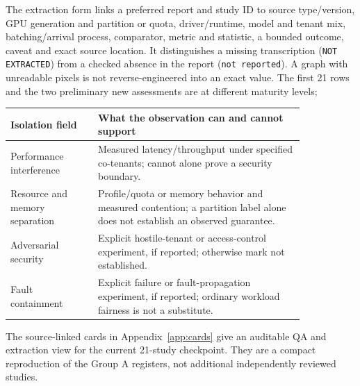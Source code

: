The extraction form links a preferred report and study ID to source type/version, GPU generation and partition or quota, driver/runtime, model and tenant mix, batching/arrival process, comparator, metric and statistic, a bounded outcome, caveat and exact source location. It distinguishes a missing transcription (\texttt{NOT EXTRACTED}) from a checked absence in the report (\texttt{not reported}). A graph with unreadable pixels is not reverse-engineered into an exact value. The first 21 rows and the two preliminary new assessments are at different maturity levels; 

\begin{longtable}{P{0.25\linewidth}P{0.59\linewidth}}
\toprule Isolation field & What the observation can and cannot support\\\midrule\endhead
Performance interference & Measured latency/throughput under specified co-tenants; cannot alone prove a security boundary.\\
Resource and memory separation & Profile/quota or memory behavior and measured contention; a partition label alone does not establish an observed guarantee.\\
Adversarial security & Explicit hostile-tenant or access-control experiment, if reported; otherwise mark not established.\\
Fault containment & Explicit failure or fault-propagation experiment, if reported; ordinary workload fairness is not a substitute.\\
\bottomrule\end{longtable}

The source-linked cards in Appendix~\ref{app:cards} give an auditable QA and extraction view for the current 21-study checkpoint. They are a compact reproduction of the Group A registers, not additional independently reviewed studies. 
